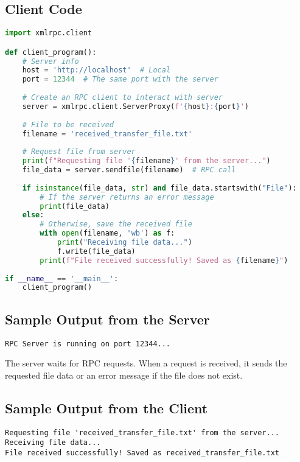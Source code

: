 \documentclass[a4paper,12pt]{article}
\begin{document}
\subsection{Client Code}

\begin{lstlisting}[language=Python, caption=Client Code]
import xmlrpc.client

def client_program():
    # Server info
    host = 'http://localhost'  # Local
    port = 12344  # The same port with the server
    
    # Create an RPC client to interact with server
    server = xmlrpc.client.ServerProxy(f'{host}:{port}')
    
    # File to be received
    filename = 'received_transfer_file.txt'
    
    # Request file from server
    print(f"Requesting file '{filename}' from the server...")
    file_data = server.sendfile(filename)  # RPC call
    
    if isinstance(file_data, str) and file_data.startswith("File"):
        # If the server returns an error message 
        print(file_data)
    else:
        # Otherwise, save the received file
        with open(filename, 'wb') as f:
            print("Receiving file data...")
            f.write(file_data)
        print(f"File received successfully! Saved as {filename}")
    
if __name__ == '__main__':
    client_program()
\end{lstlisting}

\subsection{Sample Output from the Server}

\begin{verbatim}
RPC Server is running on port 12344...
\end{verbatim}

The server waits for RPC requests. When a request is received, it sends the requested file data or an error message if the file does not exist.

\subsection{Sample Output from the Client}

\begin{verbatim}
Requesting file 'received_transfer_file.txt' from the server...
Receiving file data...
File received successfully! Saved as received_transfer_file.txt
\end{verbatim}
\end{document}
